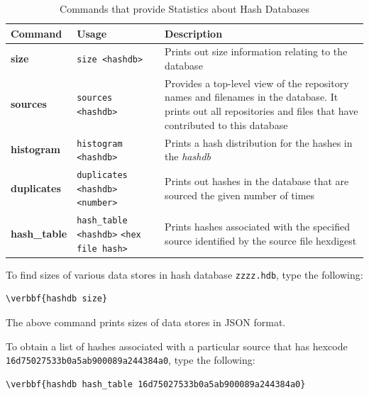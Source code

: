 \documentclass[11pt,fleqn]{article} %
\begin{document}
\begin{table}[!ht]
\centering
\caption{Commands that provide Statistics about Hash Databases}
\label{tab:statistics}
\begin{tabular}{|p{3.5 cm}|p{6 cm}|p{4 cm}|}
\hline \hline
\textbf{Command} & \textbf{Usage} & \textbf{Description} \\
\hline
\textbf{size} & \verb+size <hashdb>+ & Prints out size information relating to the database\\
\hline
\textbf{sources} & \verb+sources <hashdb>+ & Provides a top-level view of the repository names and filenames in the database. It prints out all repositories and files that have contributed to this database\\
\hline
\textbf{histogram} & \verb+histogram <hashdb>+ &  Prints a hash distribution for the hashes in the \textit{hashdb}\\
\hline
\textbf{duplicates} & \verb+duplicates <hashdb> <number>+ &  Prints out hashes in the database that are sourced the given number of times\\
\hline
\textbf{hash\_table} & \verb+hash_table <hashdb>+ \verb+<hex file hash>+ &  Prints hashes associated with the specified source identified by the source file hexdigest\\
\hline
\end{tabular}
\end{table}

To find sizes of various data stores in hash database \texttt{zzzz.hdb},
type the following:
\begin{Verbatim}[commandchars=\\\{\}]
\verbbf{hashdb size}
\end{Verbatim}
The above command prints sizes of data stores in JSON format.

To obtain a list of hashes associated with a particular source that has hexcode\\
\texttt{16d75027533b0a5ab900089a244384a0}, type the following:
\begin{Verbatim}[commandchars=\\\{\}]
\verbbf{hashdb hash_table 16d75027533b0a5ab900089a244384a0}
\end{Verbatim}
\end{document}
